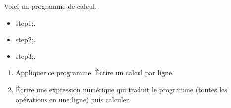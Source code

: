 \documentclass[exercice]{thedocument}%
\begin{document}
%
Voici un programme de calcul.\vskip10pt
\begin{itemize}
    \item \<step1;.
    \item \<step2;.
    \item \<step3;.
\end{itemize}
\begin{enumerate}
    \item Appliquer ce programme. Écrire un calcul par ligne.
    \item \'Ecrire une expression numérique qui traduit le programme (toutes les
    opérations en une ligne) puis calculer.
\end{enumerate}
\end{document}
